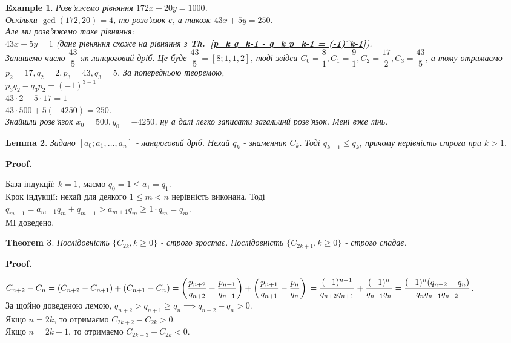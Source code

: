 \documentclass[a4paper, 14pt]{extarticle}
\makeatletter
\theoremstyle{theoremdd}
\newtheorem{theorem}{Theorem}[subsection]
\theoremstyle{theoremdd}
\theoremstyle{theoremdd}
\theoremstyle{theoremdd}
\newtheorem{example}[theorem]{Example}
\theoremstyle{theoremdd}
\theoremstyle{theoremdd}
\theoremstyle{theoremdd}
\newtheorem{lemma}[theorem]{Lemma}
\theoremstyle{theoremdd}
\def\qed{$\blacksquare$}
\renewenvironment{proof}[1][Proof.\\]{\par
\pushQED{\hfill \qed}%
\normalfont \topsep6\p@\@plus6\p@\relax
\trivlist
\item\relax
{\bfseries
#1\@addpunct{.}}\hspace\labelsep\ignorespaces
}{%
\popQED\endtrivlist\@endpefalse
}
\newcommand\thref[1]{\textbf{Th.~\ref{#1}}}
\makeatother
\begin{document}
\begin{example}
Розв'яжемо рівняння $172x+20y=1000$.\\
Оскільки $\gcd(172,20) = 4$, то розв'язок є, а також $43x + 5y  =250$.\\
Але ми розв'яжемо таке рівняння:\\
$43x + 5y = 1$ (дане рівняння схоже на рівняння з \thref{p_k q_k-1 - q_k p_k-1 = (-1)^k-1}).\\
Запишемо число $\dfrac{43}{5}$ як ланцюговий дріб. Це буде $\dfrac{43}{5} = [8;1,1,2]$, тоді звідси $C_0 = \dfrac{8}{1}, C_1 = \dfrac{9}{1}, C_2 = \dfrac{17}{2}, C_3 = \dfrac{43}{5}$, а тому отримаємо $p_2 = 17, q_2 = 2, p_3 = 43, q_3 = 5$. За попередньою теоремою,\\
$p_3q_2 - q_3p_2 = (-1)^{3-1}$\\
$43 \cdot 2 - 5 \cdot 17 = 1$\\
$43 \cdot 500 + 5 (-4250) = 250$.\\
Знайшли розв'язок $x_0 = 500, y_0 = -4250$, ну а далі легко записати загальинй розв'язок. Мені вже лінь.
\end{example}

\begin{lemma}
Задано $[a_0;a_1,\dots,a_n]$ - ланцюговий дріб. Нехай $q_k$ - знаменник $C_k$. Тоді $q_{k-1} \leq q_k$, причому нерівність строга при $k > 1$.
\end{lemma}

\begin{proof}
База індукції: $k = 1$, маємо $q_0 = 1 \leq a_1 = q_1$.\\
Крок індукції: нехай для деякого $1 \leq m < n$ нерівність виконана. Тоді\\
$q_{m+1} = a_{m+1}q_m + q_{m-1} > a_{m+1}q_m \geq 1 \cdot q_m = q_m$.\\
МІ доведено.
\end{proof}

\begin{theorem}
Послідовність $\{C_{2k}, k \geq 0\}$ - строго зростає. Послідовність $\{C_{2k+1}, k \geq 0\}$ - строго спадає.
\end{theorem}

\begin{proof}
$C_{n+2}-C_n = (C_{n+2}-C_{n+1}) + (C_{n+1}-C_n) = \left(\dfrac{p_{n+2}}{q_{n+2}} - \dfrac{p_{n+1}}{q_{n+1}}\right) + \left(\dfrac{p_{n+1}}{q_{n+1}} - \dfrac{p_{n}}{q_{n}}\right) \\
= \dfrac{(-1)^{n+1}}{q_{n+2}q_{n+1}} + \dfrac{(-1)^n}{q_{n+1}q_n} = \dfrac{(-1)^n(q_{n+2}-q_n)}{q_n q_{n+1} q_{n+2}}$.\\
За щойно доведеною лемою, $q_{n+2} > q_{n+1} \geq q_n \implies q_{n+2} - q_n > 0$.\\
Якщо $n = 2k$, то отримаємо $C_{2k+2} - C_{2k} > 0$.\\
Якщо $n = 2k+1$, то отримаємо $C_{2k+3} - C_{2k} < 0$.
\end{proof}
\end{document}

